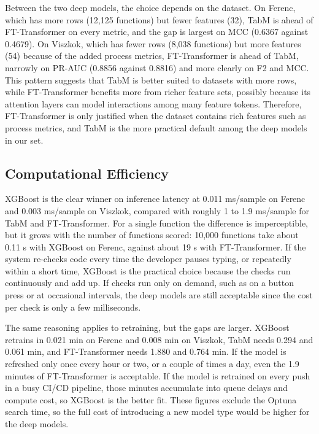 Between the two deep models, the choice depends on the dataset. On Ferenc, which has more rows (12,125 functions) but fewer features (32), TabM is ahead of FT-Transformer on every metric, and the gap is largest on MCC (0.6367 against 0.4679). On Viszkok, which has fewer rows (8,038 functions) but more features (54) because of the added process metrics, FT-Transformer is ahead of TabM, narrowly on PR-AUC (0.8856 against 0.8816) and more clearly on F2 and MCC. This pattern suggests that TabM is better suited to datasets with more rows, while FT-Transformer benefits more from richer feature sets, possibly because its attention layers can model interactions among many feature tokens. Therefore, FT-Transformer is only justified when the dataset contains rich features such as process metrics, and TabM is the more practical default among the deep models in our set.


\subsection{Computational Efficiency}

XGBoost is the clear winner on inference latency at 0.011 ms/sample on Ferenc and 0.003 ms/sample on Viszkok, compared with roughly 1 to 1.9 ms/sample for TabM and FT-Transformer. For a single function the difference is imperceptible, but it grows with the number of functions scored: 10,000 functions take about 0.11 s with XGBoost on Ferenc, against about 19 s with FT-Transformer. If the system re-checks code every time the developer pauses typing, or repeatedly within a short time, XGBoost is the practical choice because the checks run continuously and add up. If checks run only on demand, such as on a button press or at occasional intervals, the deep models are still acceptable since the cost per check is only a few milliseconds.

The same reasoning applies to retraining, but the gaps are larger. XGBoost retrains in 0.021 min on Ferenc and 0.008 min on Viszkok, TabM needs 0.294 and 0.061 min, and FT-Transformer needs 1.880 and 0.764 min. If the model is refreshed only once every hour or two, or a couple of times a day, even the 1.9 minutes of FT-Transformer is acceptable. If the model is retrained on every push in a busy CI/CD pipeline, those minutes accumulate into queue delays and compute cost, so XGBoost is the better fit. These figures exclude the Optuna search time, so the full cost of introducing a new model type would be higher for the deep models.

